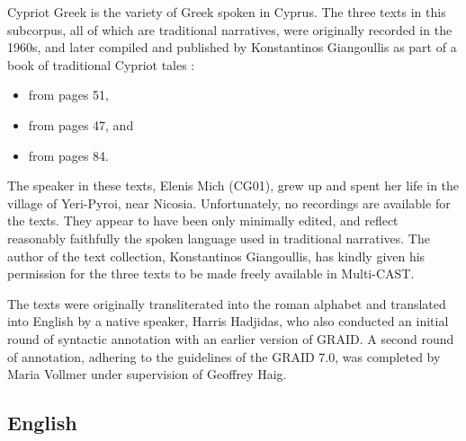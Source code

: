 \noindent Cypriot Greek is the variety of Greek spoken in Cyprus. The three texts in this subcorpus, all of which are traditional narratives, were originally recorded in the 1960s, and later compiled and published by Konstantinos Giangoullis as part of a book of traditional Cypriot tales :
%
\begin{itemize}
	\TabPositions{5em}
	\item	{}	\tab	from pages 51,
	\item	{}	\tab	from pages 47, and
	\item	{}	\tab	from pages 84.
\end{itemize}
%
The speaker in these texts, Elenis Mich (CG01), grew up and spent her life in the village of Yeri-Pyroi, near Nicosia.
%
Unfortunately, no recordings are available for the texts. They appear to have been only minimally edited, and reflect reasonably faithfully the spoken language used in traditional narratives. The author of the text collection, Konstantinos Giangoullis, has kindly given his permission for the three texts to be made freely available in Multi-CAST. %

The texts were originally transliterated into the roman alphabet and translated into English by a native speaker, Harris Hadjidas, who also conducted an initial round of syntactic annotation with an earlier version of GRAID. A second round of annotation, adhering to the guidelines of the GRAID 7.0, was completed by Maria Vollmer under supervision of Geoffrey Haig.



\subsection{English}
\label{ssec:corpus-english}

\noindent{}

